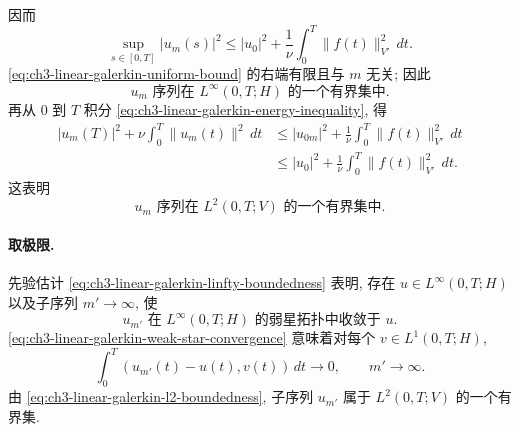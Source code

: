 \hypertarget{chapter-03-page-189}{}
因而
\begin{equation}
\sup_{s\in[0,T]}|u_m(s)|^2
\leq|u_0|^2+\frac1\nu\int_0^T\lVert f(t)\rVert_{V'}^2\,dt.
\label{eq:ch3-linear-galerkin-uniform-bound}
\end{equation}
\eqref{eq:ch3-linear-galerkin-uniform-bound} 的右端有限且与 $m$ 无关; 因此
\begin{equation}
u_m\text{ 序列在 }L^\infty(0,T;H)\text{ 的一个有界集中}.
\label{eq:ch3-linear-galerkin-linfty-boundedness}
\end{equation}
再从 $0$ 到 $T$ 积分 \eqref{eq:ch3-linear-galerkin-energy-inequality}, 得
\begin{equation}
\begin{aligned}
|u_m(T)|^2+\nu\int_0^T\lVert u_m(t)\rVert^2\,dt
&\leq|u_{0m}|^2+\frac1\nu\int_0^T\lVert f(t)\rVert_{V'}^2\,dt\\
&\leq|u_0|^2+\frac1\nu\int_0^T\lVert f(t)\rVert_{V'}^2\,dt.
\end{aligned}
\label{eq:ch3-linear-galerkin-integrated-bound}
\end{equation}
这表明
\begin{equation}
u_m\text{ 序列在 }L^2(0,T;V)\text{ 的一个有界集中}.
\label{eq:ch3-linear-galerkin-l2-boundedness}
\end{equation}

\paragraph{取极限.}
先验估计 \eqref{eq:ch3-linear-galerkin-linfty-boundedness} 表明, 存在 $u\in L^\infty(0,T;H)$ 以及子序列 $m'\to\infty$, 使
\begin{equation}
u_{m'}\text{ 在 }L^\infty(0,T;H)\text{ 的弱星拓扑中收敛于 }u.
\label{eq:ch3-linear-galerkin-weak-star-convergence}
\end{equation}
\eqref{eq:ch3-linear-galerkin-weak-star-convergence} 意味着对每个 $v\in L^1(0,T;H)$,
\begin{equation}
\int_0^T(u_{m'}(t)-u(t),v(t))\,dt\longrightarrow0,
\qquad m'\to\infty.
\label{eq:ch3-linear-galerkin-weak-star-definition}
\end{equation}
由 \eqref{eq:ch3-linear-galerkin-l2-boundedness}, 子序列 $u_{m'}$ 属于 $L^2(0,T;V)$ 的一个有界集.

